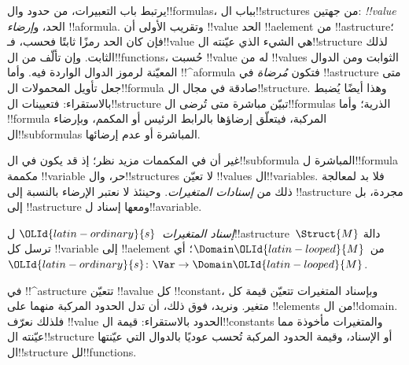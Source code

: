 \documentclass[../../../include/open-logic-section]{subfiles}
\begin{document}


\begin{explain}
يرتبط باب التعبيرات، من حدود وال!!{formula}s، بباب
ال!!{structure}s من جهتين: \emph{!!{value}} الحد، و\emph{إرضاء}
!!a{formula}. وتقريب الأولى أن !!{value} الحد !!a{element} من
!!a{structure}؛ فإن كان الحد رمزًا ثابتًا فحسب، فـ!!{value} هي الشيء
الذي عيّنته ال!!{structure} لذلك الثابت. وإن تألّف من
ال!!{function}s، حُسبت !!{value} له من !!{value}s الثوابت ومن
الدوال المعيّنة لرموز الدوال الواردة فيه. وأما !!^a{formula} فتكون
\emph{مُرضاة} في !!a{structure} متى جعل تأويل المحمولات
ال!!{formula} صادقة في مجال ال!!{structure}. وهذا أيضًا يُضبط
بالاستقراء: فتعيينات ال!!{structure} تبيّن مباشرة متى تُرضى
ال!!{formula}s الذرية؛ وأما !!{formula} المركبة، فيتعلّق إرضاؤها
بالرابط الرئيس أو المكمم، وبإرضاء ال!!{subformula}s المباشرة أو
عدم إرضائها.

غير أن في المكممات مزيد نظر؛ إذ قد يكون في ال!!{subformula}
المباشرة ل!!{formula} مكممة !!{variable} حر، وال!!{structure}s
لا تعيّن !!{value}s ال!!{variable}s. فلا بد لمعالجة ذلك من
\emph{إسنادات المتغيرات}. وحينئذ لا نعتبر الإرضاء بالنسبة إلى
!!a{structure} مجردة، بل إلى !!a{structure} ومعها إسناد
ل!!a{variable}.
\end{explain}

\begin{defn}
\emph{إسناد المتغيرات}~$\OLId{latin-ordinary}{s}$ ل!!a{structure}~$\Struct{M}$ دالة ترسل
كل !!{variable} إلى !!a{element} من~$\Domain \OLId{latin-looped}{M}$؛ أي
$\OLId{latin-ordinary}{s}\colon \Var \to \Domain \OLId{latin-looped}{M}$.
\end{defn}

\begin{explain}
في !!^a{structure} تتعيّن !!a{value} كل !!{constant}، وبإسناد
المتغيرات تتعيّن قيمة كل متغير. ونريد، فوق ذلك، أن تدل الحدود
المركبة منهما على !!{element}s من ال!!{domain}. فلذلك نعرّف
!!{value} الحدود بالاستقراء: قيمة ال!!{constant}s والمتغيرات
مأخوذة مما عيّنته ال!!{structure} أو الإسناد، وقيمة الحدود
المركبة تُحسب عوديًا بالدوال التي عيّنتها ال!!{structure}
لل!!{function}s.
\end{explain}
\end{document}
